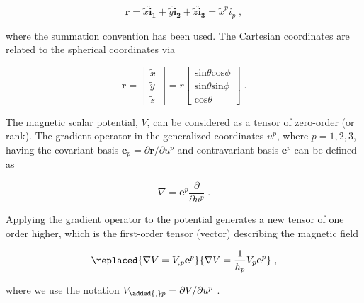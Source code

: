 \documentclass[extra,mreferee]{gji}
\begin{document}
\begin{equation}
\mathbf{r}  = \tilde{x}\mathbf{\hat{i}_1}+\tilde{y}\mathbf{\hat{i}_2}+\tilde{z}\mathbf{\hat{i}_3} = \tilde{x}^p i_p \; , \label{eq:position_vec}
\end{equation}

where the summation convention has been used. The Cartesian coordinates are related to the spherical coordinates via \citep[p.~363]{Riley_etal_2004}

\begin{equation}
\mathbf{r} = \begin{bmatrix} \tilde{x} \\ \tilde{y} \\ \tilde{z} \end{bmatrix} = r \begin{bmatrix} \mathrm{sin}\theta\mathrm{cos}\phi \\ \mathrm{sin}\theta\mathrm{sin}\phi \\ \mathrm{cos}\theta \end{bmatrix} \; .\label{eq:position_coor}
\end{equation}

The magnetic scalar potential, $V$, can be considered as a tensor of zero-order (or rank). The gradient operator in the generalized coordinates $u^p$, where $p=1,2,3$, having the covariant basis $\mathbf{e}_p=\partial \mathbf{r}/\partial u^p$ and contravariant basis $\mathbf{e}^p$ can be defined as \citep{Riley_etal_2004,Casotto_Fantino_2009}

\begin{equation}
\nabla = \mathbf{e}^p \frac{\partial}{\partial u^p} \; .  \label{eq:nabla}
\end{equation}

Applying the gradient operator to the potential generates a new tensor of one order higher, which is the first-order tensor (vector) describing the magnetic field

\begin{equation}
\replaced{\nabla V = V_{,p}\mathbf{e}^p}{\nabla V = \frac{1}{h_p} V_p \mathbf{e}^p} \; ,  \label{eq:nabla_v}
\end{equation}

where we use the  notation $V_{\added{,}p} = \partial V / \partial u^p$ .  
\end{document}
